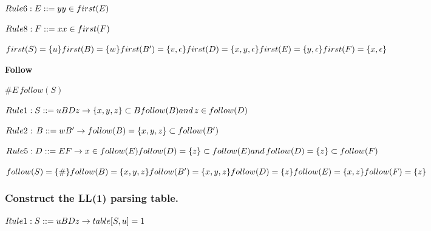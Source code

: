 \documentclass[a4paper, 12pt]{article}
\begin{document}
            $Rule 6: E::= y\\
            y \in first(E)$
            
            $Rule 8: F::=x\\
            x \in first(F)$
            
            $first(S) = \{u\}\\
            first(B) = \{w\}\\
            first(B') = \{v,\epsilon\}\\
            first(D) = \{x,y,\epsilon\}\\
            first(E) = \{y,\epsilon\}\\
            first(F) = \{x, \epsilon\}$
            
            \textbf{Follow}
            
            $\#E \, follow(S)$
            
            $Rule 1: S::= uBDz\\
            \rightarrow \{x,y,z\} \subset B follow(B)\\
            and \, z \in follow(D)$
            
            $Rule 2: \, B::= wB'\\
            \rightarrow follow(B)=\{x,y,z\} \subset follow(B')$
            
            $Rule 5: D::=EF\\
            \rightarrow x \in follow(E)\\
            follow(D) = \{z\} \subset follow(E)\\
            and \, follow(D) = \{z\} \subset follow(F)$
             
            $follow(S) = \{\#\}\\
            follow(B) = \{x,y,z\}\\
            follow(B') = \{x,y,z\}\\
            follow(D) = \{z\}\\
            follow(E) = \{x,z\}\\
            follow(F) = \{z\}$
            
        \subsubsection{Construct the LL(1) parsing table.}
        
            $Rule 1: S::= uBDz\\
            \rightarrow table[S,u] = 1$
            
\end{document}
